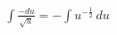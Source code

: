 \documentclass[preview]{standalone}
\begin{document}
\begin{align*}
\int \frac{-du}{\sqrt{u}} = -\int u^{-\frac{1}{2}} \, du
\end{align*}
\end{document}
